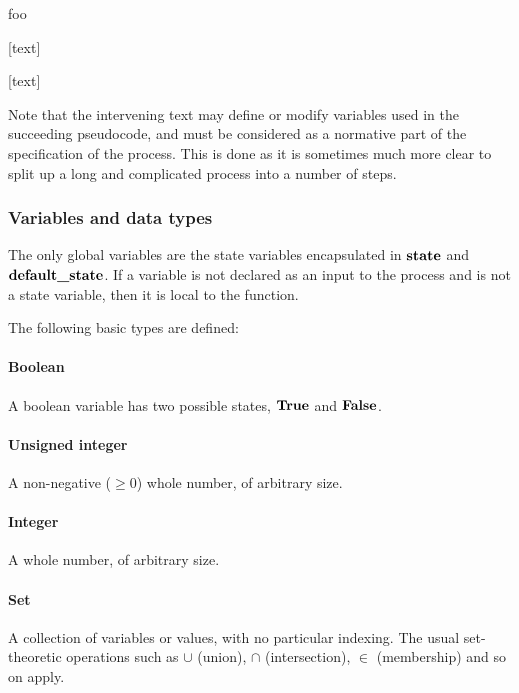 \begin{pseudo}{foo}{}
\bsCODE{\hdots}
\end{pseudo}

[text]

\begin{pseudo*}
\bsCODE{\hdots}
\end{pseudo*}

[text]

\begin{pseudo*}
\end{pseudo*}

Note that the intervening text may define or modify variables used in the succeeding
pseudocode, and must be considered as a normative part of the specification of the process.
This is done as it is sometimes much more clear to split up a long and complicated process
into a number of steps.

\subsubsection{Variables and data types}
\label{datatypes}

The only global variables are the state variables encapsulated in $\textbf{state}$
and $\textbf{default\_state}$. If a variable is not declared as an input to
the process and is not a state variable, then it is local to the function.

The following basic types are defined:

\paragraph*{Boolean} A boolean variable has two possible states, $\text{\bf{True}}$ and $\text{\bf{False}}$.

\paragraph*{Unsigned integer} A non-negative ($\geq 0$) whole number, of arbitrary size.

\paragraph*{Integer} A whole number, of arbitrary size.

\paragraph*{Set} A collection of variables or values, with no particular indexing. The usual
set-theoretic operations such as $\cup$ (union), $\cap$ (intersection), $\in$ (membership)
and so on apply.

